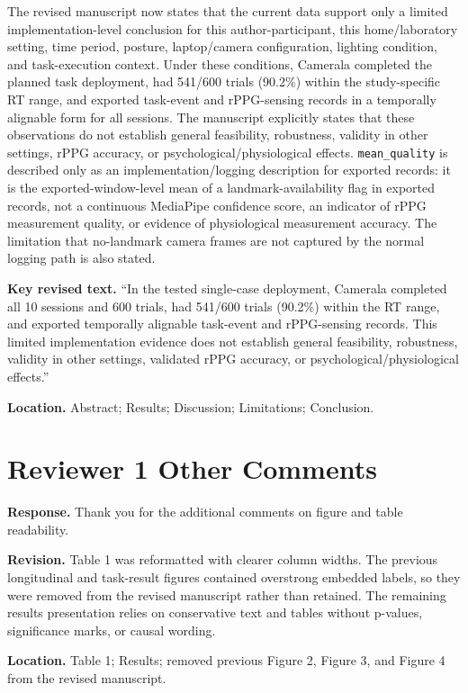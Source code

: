 \documentclass[11pt]{article}
\begin{document}
The revised manuscript now states that the current data support only a limited implementation-level conclusion for this author-participant, this home/laboratory setting, time period, posture, laptop/camera configuration, lighting condition, and task-execution context.
Under these conditions, Camerala completed the planned task deployment, had 541/600 trials (90.2\%) within the study-specific RT range, and exported task-event and rPPG-sensing records in a temporally alignable form for all sessions.
The manuscript explicitly states that these observations do not establish general feasibility, robustness, validity in other settings, rPPG accuracy, or psychological/physiological effects.
\texttt{mean\_quality} is described only as an implementation/logging description for exported records: it is the exported-window-level mean of a landmark-availability flag in exported records, not a continuous MediaPipe confidence score, an indicator of rPPG measurement quality, or evidence of physiological measurement accuracy.
The limitation that no-landmark camera frames are not captured by the normal logging path is also stated.

\textbf{Key revised text.}
``In the tested single-case deployment, Camerala completed all 10 sessions and 600 trials, had 541/600 trials (90.2\%) within the RT range, and exported temporally alignable task-event and rPPG-sensing records.
This limited implementation evidence does not establish general feasibility, robustness, validity in other settings, validated rPPG accuracy, or psychological/physiological effects.''

\textbf{Location.}
Abstract; Results; Discussion; Limitations; Conclusion.

\section*{Reviewer 1 Other Comments}
\textbf{Response.}
Thank you for the additional comments on figure and table readability.

\textbf{Revision.}
Table 1 was reformatted with clearer column widths.
The previous longitudinal and task-result figures contained overstrong embedded labels, so they were removed from the revised manuscript rather than retained.
The remaining results presentation relies on conservative text and tables without p-values, significance marks, or causal wording.

\textbf{Location.}
Table 1; Results; removed previous Figure 2, Figure 3, and Figure 4 from the revised manuscript.
\end{document}
